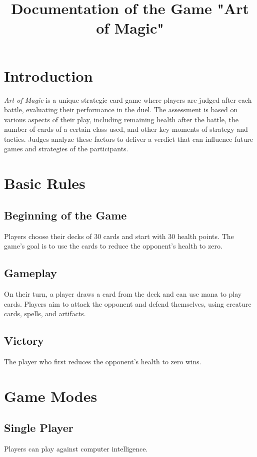 \documentclass[12pt,a4paper]{article}
\title{\Large Documentation of the Game \textbf{"Art of Magic"}}
\author{}
\date{}
\begin{document}
\maketitle

\section{Introduction}
\textit{Art of Magic} is a unique strategic card game where players are judged after each battle, evaluating their performance in the duel. The assessment is based on various aspects of their play, including remaining health after the battle, the number of cards of a certain class used, and other key moments of strategy and tactics. Judges analyze these factors to deliver a verdict that can influence future games and strategies of the participants.

\section{Basic Rules}
\subsection{Beginning of the Game}
Players choose their decks of 30 cards and start with 30 health points. The game's goal is to use the cards to reduce the opponent's health to zero.

\subsection{Gameplay}
On their turn, a player draws a card from the deck and can use mana to play cards. Players aim to attack the opponent and defend themselves, using creature cards, spells, and artifacts.

\subsection{Victory}
The player who first reduces the opponent's health to zero wins.

\section{Game Modes}
\subsection{Single Player}
Players can play against computer intelligence.
\end{document}
